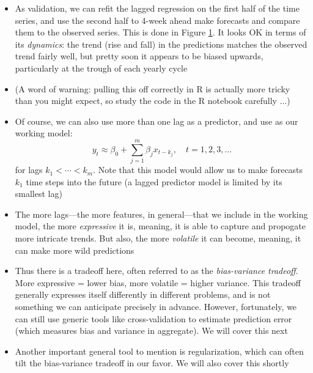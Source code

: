 \documentclass{article}
\begin{document}
\begin{itemize}
\begin{figure}[htb]
\caption{As in the above figure, but pseudo-prospective forecasts on the second
  half, from a regression model fit only to the first half.} 
\label{fig:cardio_split}
\end{figure}

\item As validation, we can refit the lagged regression on the first half of the
  time series, and use the second half to 4-week ahead make forecasts and
  compare them to the observed series. This is done in Figure
  \ref{fig:cardio_split}. It looks OK in terms of its \emph{dynamics}: the trend
  (rise and fall) in the predictions matches the observed trend fairly well, but
  pretty soon it appears to be biased upwards, particularly at the trough of
  each yearly cycle  

\item (A word of warning: pulling this off correctly in R is actually more
  tricky than you might expect, so study the code in the R notebook carefully
  ...)   

\item Of course, we can also use more than one lag as a predictor, and use as
  our working model:
  \[
  y_t \approx \beta_0 + \sum_{j=1}^m \beta_j x_{t-k_j}, \quad t = 1,2,3,\dots
  \]
  for lags $k_1 < \cdots < k_m$. Note that this model would allow us to make
  forecasts $k_1$ time steps into the future (a lagged predictor model is
  limited by its smallest lag)

\item The more lags---the more features, in general---that we include in the
  working model, the more \emph{expressive} it is, meaning, it is able to
  capture and propogate more intricate trends. But also, the more
  \emph{volatile} it can become, meaning, it can make more wild predictions 

\item Thus there is a tradeoff here, often referred to as the
  \emph{bias-variance tradeoff}. More expressive = lower bias, more volatile =
  higher variance. This tradeoff generally expresses itself differently in
  different problems, and is not something we can anticipate precisely in
  advance. However, fortunately, we can still use generic tools like
  cross-validation to estimate prediction error (which measures bias and
  variance in aggregate). We will cover this next

\item Another important general tool to mention is regularization, which can
  often tilt the bias-variance tradeoff in our favor. We will also cover this
  shortly 
\end{itemize}
\end{document}
